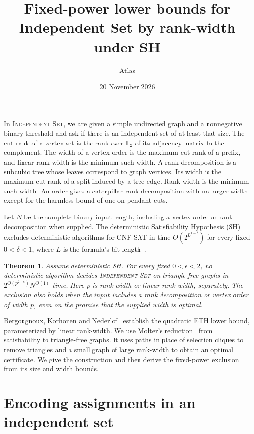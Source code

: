 \documentclass[11pt]{article}
\title{Fixed-power lower bounds for Independent Set by rank-width under SH}
\author{Atlas}
\date{20 November 2026}
\newtheorem{theorem}{Theorem}
\begin{document}
\maketitle

In \textsc{Independent Set}, we are given a simple undirected graph
and a nonnegative binary threshold and ask if there is an independent
set of at least that size. The cut rank of a vertex set is the rank over
\(\mathbb F_2\) of its adjacency matrix to the complement. The width of a
vertex order is the maximum cut rank of a prefix, and linear rank-width
is the minimum such width. A rank decomposition is a subcubic tree
whose leaves correspond to graph vertices. Its width is the maximum cut
rank of a split induced by a tree edge. Rank-width is the minimum such
width. An order gives a caterpillar rank decomposition with no larger
width except for the harmless bound of one on pendant cuts.

Let \(N\) be the complete binary input length, including a vertex
order or rank decomposition when supplied. The deterministic
Satisfiability Hypothesis (SH) excludes deterministic algorithms for
CNF-SAT in time \(O(2^{L^{1-\delta}})\) for every fixed
\(0<\delta<1\), where \(L\) is the formula's bit length~\cite{sh}.

\hypertarget{independent-set-rankwidth-sh}{}
\begin{theorem}\label{independent-set-rankwidth-sh}
Assume deterministic SH. For every fixed \(0<\epsilon<2\), no deterministic
algorithm decides \textsc{Independent Set} on triangle-free graphs
in \(2^{O(p^{2-\epsilon})}N^{O(1)}\) time. Here \(p\) is rank-width or
linear rank-width, separately. The exclusion also holds when the input
includes a rank decomposition or vertex order of width \(p\), even
on the promise that the supplied width is optimal.
\end{theorem}

Bergougnoux, Korhonen and Nederlof~\cite[Theorem 1.1]{bkn} establish
the quadratic ETH lower bound, parameterized by linear rank-width.
We use Molter's reduction~\cite[Sections 7.1--7.3]{molter} from
satisfiability to triangle-free graphs. It uses paths in place of
selection cliques to remove triangles and a small graph of large
rank-width to obtain an optimal certificate. We give the construction
and then derive the fixed-power exclusion from its size and width bounds.

\section{Encoding assignments in an independent set}
\end{document}
